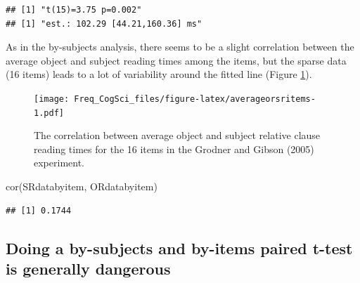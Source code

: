 \documentclass[
  12pt,
]{krantz}
\newenvironment{Shaded}{\begin{snugshade}}{\end{snugshade}}
\newcommand{\FunctionTok}[1]{\textcolor[rgb]{0.00,0.00,0.00}{#1}}
\newcommand{\NormalTok}[1]{#1}
\newcommand{\OtherTok}[1]{\textcolor[rgb]{0.56,0.35,0.01}{#1}}
\newcommand{\SpecialCharTok}[1]{\textcolor[rgb]{0.00,0.00,0.00}{#1}}
\newcommand{\StringTok}[1]{\textcolor[rgb]{0.31,0.60,0.02}{#1}}
\theoremstyle{definition}
\theoremstyle{definition}
\theoremstyle{definition}
\theoremstyle{definition}
\theoremstyle{remark}
\begin{document}
\begin{verbatim}
## [1] "t(15)=3.75 p=0.002"
## [1] "est.: 102.29 [44.21,160.36] ms"
\end{verbatim}

As in the by-subjects analysis, there seems to be a slight correlation between the average object and subject reading times among the items, but the sparse data (16 items) leads to a lot of variability around the fitted line (Figure \ref{fig:averageorsritems}).

\begin{Shaded}
\end{Shaded}

\begin{figure}
\centering
\texttt{[image: Freq\_CogSci\_files/figure-latex/averageorsritems-1.pdf]}
\caption{\label{fig:averageorsritems}The correlation between average object and subject relative clause reading times for the 16 items in the Grodner and Gibson (2005) experiment.}
\end{figure}

\begin{Shaded}
\begin{Highlighting}[]
\FunctionTok{cor}\NormalTok{(SRdatabyitem, ORdatabyitem)}
\end{Highlighting}
\end{Shaded}

\begin{verbatim}
## [1] 0.1744
\end{verbatim}

\hypertarget{doing-a-by-subjects-and-by-items-paired-t-test-is-generally-dangerous}{%
\subsection{Doing a by-subjects and by-items paired t-test is generally dangerous}\label{doing-a-by-subjects-and-by-items-paired-t-test-is-generally-dangerous}}
\end{document}

